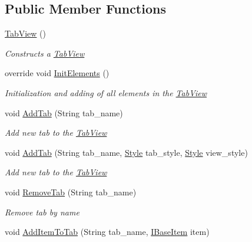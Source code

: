 \subsection*{Public Member Functions}
\begin{DoxyCompactItemize}
\item 
\mbox{\hyperlink{class_space_v_i_l_1_1_tab_view_ade6f178694207c08c008d3caee32dcd5}{Tab\+View}} ()
\begin{DoxyCompactList}\small\item\em Constructs a \mbox{\hyperlink{class_space_v_i_l_1_1_tab_view}{Tab\+View}} \end{DoxyCompactList}\item 
override void \mbox{\hyperlink{class_space_v_i_l_1_1_tab_view_ae19ec535e78dee9eca9ac433e2b2bca5}{Init\+Elements}} ()
\begin{DoxyCompactList}\small\item\em Initialization and adding of all elements in the \mbox{\hyperlink{class_space_v_i_l_1_1_tab_view}{Tab\+View}} \end{DoxyCompactList}\item 
void \mbox{\hyperlink{class_space_v_i_l_1_1_tab_view_a79d231232e2932821229e9837f5bf4f1}{Add\+Tab}} (String tab\+\_\+name)
\begin{DoxyCompactList}\small\item\em Add new tab to the \mbox{\hyperlink{class_space_v_i_l_1_1_tab_view}{Tab\+View}} \end{DoxyCompactList}\item 
void \mbox{\hyperlink{class_space_v_i_l_1_1_tab_view_a08c96af296bf4e6485deb5def851d904}{Add\+Tab}} (String tab\+\_\+name, \mbox{\hyperlink{class_space_v_i_l_1_1_decorations_1_1_style}{Style}} tab\+\_\+style, \mbox{\hyperlink{class_space_v_i_l_1_1_decorations_1_1_style}{Style}} view\+\_\+style)
\begin{DoxyCompactList}\small\item\em Add new tab to the \mbox{\hyperlink{class_space_v_i_l_1_1_tab_view}{Tab\+View}} \end{DoxyCompactList}\item 
void \mbox{\hyperlink{class_space_v_i_l_1_1_tab_view_a5ea4b28772c302bc05b558ac104ea831}{Remove\+Tab}} (String tab\+\_\+name)
\begin{DoxyCompactList}\small\item\em Remove tab by name \end{DoxyCompactList}\item 
void \mbox{\hyperlink{class_space_v_i_l_1_1_tab_view_a1372d1fa43f967c2c7f8f5f11fa5b214}{Add\+Item\+To\+Tab}} (String tab\+\_\+name, \mbox{\hyperlink{interface_space_v_i_l_1_1_core_1_1_i_base_item}{I\+Base\+Item}} item)

\end{DoxyCompactItemize}

